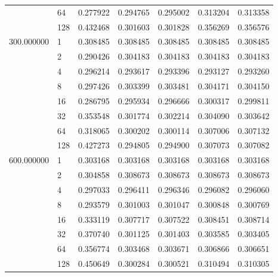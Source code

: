 \begin{tabular}{llrrrrr}
 & 64 & 0.277922 & 0.294765 & 0.295002 & 0.313204 & 0.313358 \\
 & 128 & 0.432468 & 0.301603 & 0.301828 & 0.356269 & 0.356576 \\
\multirow[c]{8}{*}{300.000000} & 1 & 0.308485 & 0.308485 & 0.308485 & 0.308485 & 0.308485 \\
 & 2 & 0.290426 & 0.304183 & 0.304183 & 0.304183 & 0.304183 \\
 & 4 & 0.296214 & 0.293617 & 0.293396 & 0.293127 & 0.293260 \\
 & 8 & 0.297426 & 0.303399 & 0.303481 & 0.304171 & 0.304150 \\
 & 16 & 0.286795 & 0.295934 & 0.296666 & 0.300317 & 0.299811 \\
 & 32 & 0.353548 & 0.301774 & 0.302214 & 0.304090 & 0.303642 \\
 & 64 & 0.318065 & 0.300202 & 0.300114 & 0.307006 & 0.307132 \\
 & 128 & 0.427273 & 0.294805 & 0.294900 & 0.307073 & 0.307082 \\
\multirow[c]{8}{*}{600.000000} & 1 & 0.303168 & 0.303168 & 0.303168 & 0.303168 & 0.303168 \\
 & 2 & 0.304858 & 0.308673 & 0.308673 & 0.308673 & 0.308673 \\
 & 4 & 0.297033 & 0.296411 & 0.296346 & 0.296082 & 0.296060 \\
 & 8 & 0.293579 & 0.301003 & 0.301047 & 0.300848 & 0.300769 \\
 & 16 & 0.333119 & 0.307717 & 0.307522 & 0.308451 & 0.308714 \\
 & 32 & 0.370740 & 0.301125 & 0.301403 & 0.303585 & 0.303405 \\
 & 64 & 0.356774 & 0.303468 & 0.303671 & 0.306866 & 0.306651 \\
 & 128 & 0.450649 & 0.300284 & 0.300521 & 0.310494 & 0.310305 \\
\end{tabular}
